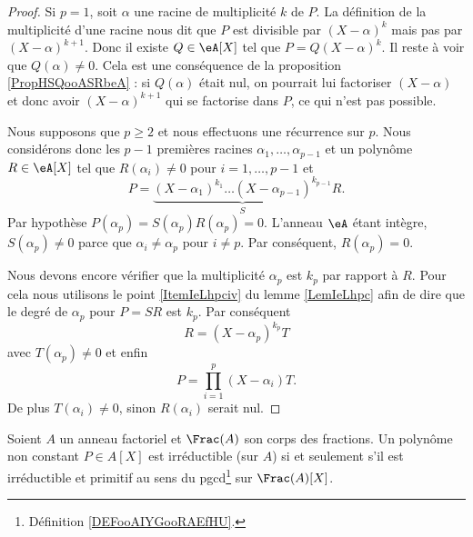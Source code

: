 \begin{proof}
    Si \( p=1\), soit \( \alpha\) une racine de multiplicité \( k\) de \( P\). La définition de la multiplicité d'une racine nous dit que \( P\) est divisible par \( (X-\alpha)^k\) mais pas par \( (X-\alpha)^{k+1}\). Donc il existe \( Q\in \eA[X]\) tel que \( P=Q(X-\alpha)^k\). Il reste à voir que \( Q(\alpha)\neq 0\). Cela est une conséquence de la proposition \ref{PropHSQooASRbeA} : si \( Q(\alpha)\) était nul, on pourrait lui factoriser \( (X-\alpha)\) et donc avoir \( (X-\alpha)^{k+1}\) qui se factorise dans \( P\), ce qui n'est pas possible.

    Nous supposons que \( p\geq 2\) et nous effectuons une récurrence sur \( p\). Nous considérons donc les \( p-1\) premières racines \( \alpha_1,\ldots, \alpha_{p-1}\) et un polynôme \( R\in\eA[X]\) tel que \( R(\alpha_i)\neq 0\) pour \( i=1,\ldots, p-1\) et
    \begin{equation}
        P=\underbrace{(X-\alpha_1)^{k_1}\ldots (X-\alpha_{p-1})^{k_{p-1}}}_SR.
    \end{equation}
    Par hypothèse \( P(\alpha_p)=S(\alpha_p)R(\alpha_p)=0\). L'anneau \( \eA\) étant intègre, \( S(\alpha_p)\neq 0\) parce que \( \alpha_i\neq \alpha_p\) pour \( i\neq p\). Par conséquent, \( R(\alpha_p)=0\).
    
    Nous devons encore vérifier que la multiplicité \( \alpha_p\) est \( k_p\) par rapport à \( R\). Pour cela nous utilisons le point \ref{ItemIeLhpciv} du lemme \ref{LemIeLhpc} afin de dire que le degré de \( \alpha_p\) pour \( P=SR\) est \( k_p\). Par conséquent
    \begin{equation}
        R=(X-\alpha_p)^{k_p}T
    \end{equation}
    avec \( T(\alpha_p)\neq 0\) et enfin
    \begin{equation}
        P=\prod_{i=1}^p(X-\alpha_i)T.
    \end{equation}
    De plus \( T(\alpha_i)\neq 0\), sinon \( R(\alpha_i)\) serait nul.
\end{proof}

\begin{corollary}       \label{CORooZCSOooHQVAOV}
    Soient \( A\) un anneau factoriel et \( \Frac(A)\) son corps des fractions. Un polynôme non constant \( P\in A[X]\) est irréductible (sur \( A\)) si et seulement s'il est irréductible et primitif au sens du pgcd\footnote{Définition \ref{DEFooAIYGooRAEfHU}.} sur \( \Frac(A)[X]\). 
\end{corollary}

